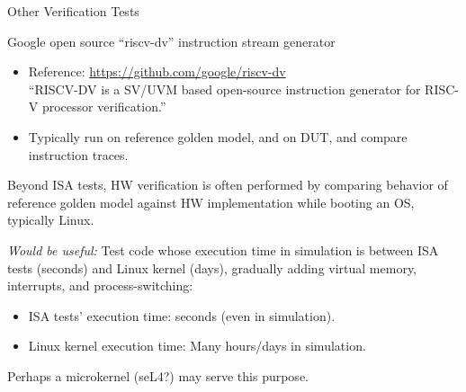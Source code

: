 \documentclass{article}
\begin{document}
\clearpage


\begin{center}
  {\Huge
    Other Verification Tests}

  \vspace*{1in}

  \begin{minipage}{9in}\Large
    Google open source ``riscv-dv'' instruction stream generator

    \begin{itemize}
    \item Reference: \url{https://github.com/google/riscv-dv} \\
    ``RISCV-DV is a SV/UVM based open-source instruction
      generator for RISC-V processor verification.''

    \item Typically run on reference golden model, and on DUT, and compare
      instruction traces.
    \end{itemize}

    \vspace*{0.75in}

    Beyond ISA tests, HW verification is often performed by comparing
    behavior of reference golden model against HW implementation while
    booting an OS, typically Linux.

    \vspace*{0.75in}

    \emph{Would be useful:} Test code whose execution time in
    simulation is between ISA tests (seconds) and Linux kernel (days),
    gradually adding virtual memory, interrupts, and
    process-switching:

    \begin{itemize}
    \item ISA tests' execution time: seconds (even in simulation).
    \item Linux kernel execution time: Many hours/days in simulation.
    \end{itemize}
    
    Perhaps a microkernel (seL4?) may serve this purpose.

  \end{minipage}
\end{center}

\clearpage

\end{document}
